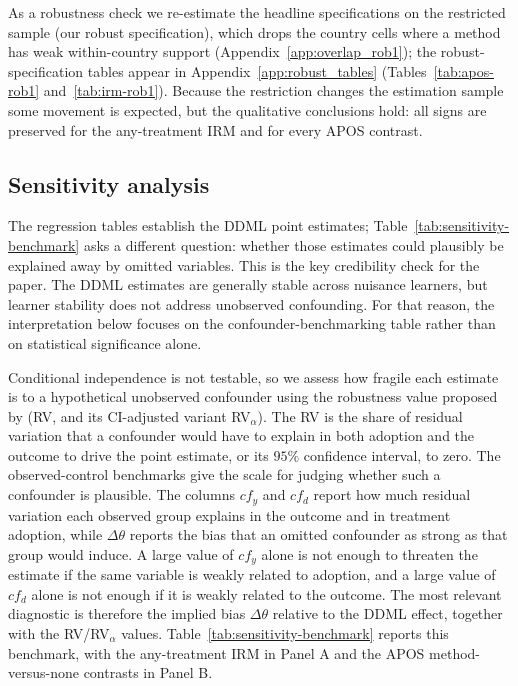 \documentclass [11pt]{article}
\theoremstyle{plain}
\theoremstyle{definition}
\theoremstyle{remark}
\newcommand{\1}{\bm{1}}
\begin{document}
As a robustness check we re-estimate the headline specifications on the restricted sample (our robust specification), which drops the country cells where a method has weak within-country support (Appendix~\ref{app:overlap_rob1}); the robust-specification tables appear in Appendix~\ref{app:robust_tables} (Tables~\ref{tab:apos-rob1} and~\ref{tab:irm-rob1}). Because the restriction changes the estimation sample some movement is expected, but the qualitative conclusions hold: all signs are preserved for the any-treatment IRM and for every APOS contrast.

\subsection{Sensitivity analysis}
The regression tables establish the DDML point estimates; Table~\ref{tab:sensitivity-benchmark} asks a different question: whether those estimates could plausibly be explained away by omitted variables. This is the key credibility check for the paper. The DDML estimates are generally stable across nuisance learners, but learner stability does not address unobserved confounding. For that reason, the interpretation below focuses on the confounder-benchmarking table rather than on statistical significance alone.

Conditional independence is not testable, so we assess how fragile each estimate is to a hypothetical unobserved confounder using the robustness value proposed by \citet{chernozhukov2022long} (RV, and its CI-adjusted variant RV$_\alpha$). The RV is the share of residual variation that a confounder would have to explain in both adoption and the outcome to drive the point estimate, or its $95\%$ confidence interval, to zero. The observed-control benchmarks give the scale for judging whether such a confounder is plausible. The columns $cf_y$ and $cf_d$ report how much residual variation each observed group explains in the outcome and in treatment adoption, while $\Delta\theta$ reports the bias that an omitted confounder as strong as that group would induce. A large value of $cf_y$ alone is not enough to threaten the estimate if the same variable is weakly related to adoption, and a large value of $cf_d$ alone is not enough if it is weakly related to the outcome. The most relevant diagnostic is therefore the implied bias $\Delta\theta$ relative to the DDML effect, together with the RV/RV$_\alpha$ values. Table~\ref{tab:sensitivity-benchmark} reports this benchmark, with the any-treatment IRM in Panel A and the APOS method-versus-none contrasts in Panel B.
\end{document}
